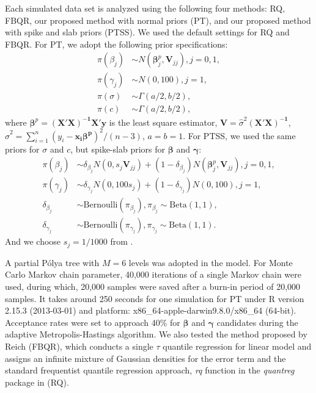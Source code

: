\documentclass[12pt]{article}
\newcommand{\polya}{P\'{o}lya}
\begin{document}
Each simulated data set is analyzed using the following four methods:
RQ, FBQR, our proposed method with normal priors (PT), and our
proposed method with spike and slab priors (PTSS).  We used the
default settings for RQ and FBQR.  For PT, we adopt the following
prior specifications:
\begin{align*}
  \pi(\beta_j) & \sim N(\bm \beta_j^p, \bm V_{jj}) , j = 0, 1,\\
  \pi(\gamma_j) & \sim N(0, 100), j = 1,\\
  \pi(\sigma) & \sim \Gamma (a/2, b/2), \\
  \pi(c) & \sim \Gamma(a/2, b/2),
\end{align*}
where $\bm \beta^p = \bm{(X'X)^{-1}X'y}$ is the least square
estimator, $\bm V = \hat{\sigma}^2\bm{(X'X)^{-1}}$, $\hat{\sigma}^2 =
\sum_{i = 1}^n (y_i - \bm {x_i \beta^p})^2/ (n - 3)$, $a = b = 1$.
For PTSS, we used the same priors for $\sigma$ and $c$, but spike-slab
priors for $\bm \beta$ and $\bm \gamma$:
\begin{align*}
  \pi(\beta_j) & \sim \delta_{\beta_j}N(0, s_j\bm V_{jj}) +  (1 - \delta_{\beta_j})N(\bm \beta_j^p, \bm V_{jj}) , j = 0, 1, \\
  \pi(\gamma_j) & \sim \delta_{\gamma_j}N(0, 100s_j) + (1 - \delta_{\gamma_j}) N(0, 100), j = 1, \\
  \delta_{\beta_j} & \sim \mbox{Bernoulli}(\pi_{\beta_j}) , \pi_{\beta_j} \sim \mbox{Beta}(1, 1),\\
  \delta_{\gamma_j} & \sim \mbox{Bernoulli}(\pi_{\gamma_j}),
  \pi_{\gamma_j} \sim \mbox{Beta}(1, 1).
\end{align*}
And we choose $s_j = 1/1000$ from \cite{george1993}.

A partial \polya{} tree with $M=6$ levels was adopted in the
model. For Monte Carlo Markov chain parameter, 40,000 iterations of a
single Markov chain were used, during which, 20,000 samples were saved
after a burn-in period of 20,000 samples.  It takes around 250 seconds
for one simulation for PT under R version 2.15.3 (2013-03-01) and
platform: x86\_64-apple-darwin9.8.0/x86\_64 (64-bit). Acceptance rates
were set to approach 40\% for $\bm{\beta}$ and $\bm{\gamma}$
candidates during the adaptive Metropolis-Hastings algorithm.  We also
tested the method proposed by Reich (FBQR), which conducts a single
$\tau$ quantile regression for linear model and assigns an infinite
mixture of Gaussian densities for the error term and the standard
frequentist quantile regression approach, \textit{rq} function in the
\textit{quantreg} package \citep{quantreg} in \cite{R} (RQ).
\end{document}
